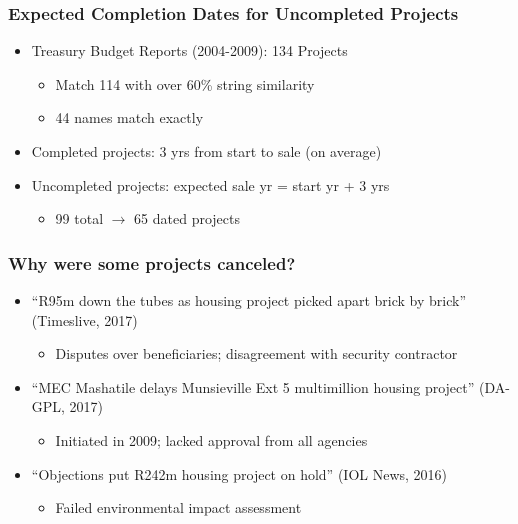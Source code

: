 \documentclass[aspectratio=149]{beamer}
\begin{document}

\begin{frame}
\frametitle{Expected Completion Dates for Uncompleted Projects}

\begin{itemize}
  \item Treasury Budget Reports (2004-2009): 134 Projects
    \begin{itemize}
      \item Match 114 with over 60\% string similarity
      \item 44 names match exactly
    \end{itemize}
  \item Completed projects: 3 yrs from start to sale (on average)
  \item Uncompleted projects: expected sale yr = start yr + 3 yrs
    \begin{itemize}
      \item 99 total $\rightarrow$ 65 dated projects
    \end{itemize}
\end{itemize}
\end{frame}





\begin{frame}
\frametitle{Why were some projects canceled?}
\begin{itemize}
\item ``R95m down the tubes as housing project picked apart brick by brick'' (Timeslive, 2017)
  \begin{itemize}
    \item Disputes over beneficiaries; disagreement with security contractor
  \end{itemize}
\vspace{.5cm}
\item ``MEC Mashatile delays Munsieville Ext 5 multimillion housing project'' (DA-GPL, 2017)
  \begin{itemize}
    \item Initiated in 2009; lacked approval from all agencies
  \end{itemize}
\vspace{.5cm}
\item ``Objections put R242m housing project on hold'' (IOL News, 2016)
  \begin{itemize}
    \item Failed environmental impact assessment
  \end{itemize}

\end{itemize}
\end{frame}
\end{document}
